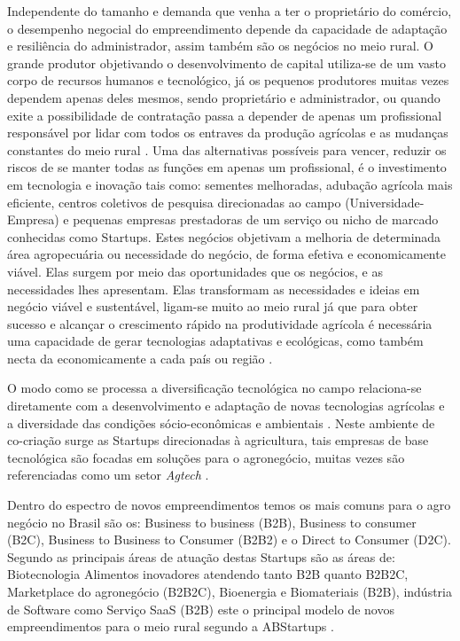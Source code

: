 Independente do tamanho e demanda que venha a ter o proprietário do comércio, o desempenho negocial do empreendimento depende da capacidade de adaptação e resiliência  do administrador, assim também são os negócios no meio rural. O grande produtor objetivando o desenvolvimento de capital utiliza-se de um vasto corpo de recursos humanos e tecnológico, já os pequenos produtores muitas vezes dependem apenas deles mesmos, sendo proprietário e administrador, ou quando exite a possibilidade de contratação passa a depender de apenas um profissional responsável por lidar com todos os entraves da produção agrícolas e as mudanças constantes do meio rural \cite{soares_relacao_2017}. Uma das alternativas possíveis para vencer, reduzir os riscos de se manter todas as funções em apenas um profissional, é o investimento em tecnologia e inovação tais como: sementes melhoradas, adubação agrícola mais eficiente, centros coletivos de pesquisa direcionadas ao campo (Universidade-Empresa) \cite{bochi_dorneles_coletivos_2014, gomes_inovacao_2014} e pequenas empresas prestadoras de um serviço ou nicho de marcado conhecidas como Startups. Estes negócios objetivam a melhoria de determinada área agropecuária \cite{junior_agtechs:_2019} ou necessidade do negócio, de forma efetiva e economicamente viável. Elas surgem por meio das oportunidades que os negócios, e as necessidades lhes apresentam. Elas transformam as necessidades e ideias em negócio viável e sustentável, ligam-se muito ao meio rural já que para obter sucesso e alcançar o crescimento rápido na produtividade agrícola é necessária uma capacidade de gerar tecnologias adaptativas e ecológicas, como também necta da  economicamente a cada país ou região \cite{contini_hayami_2019}.


O modo como se processa a diversificação tecnológica no campo relaciona-se diretamente com a desenvolvimento e adaptação de novas tecnologias agrícolas e a diversidade das condições sócio-econômicas e ambientais \cite{fen-azmeyer_o_2019}. Neste ambiente de co-criação surge as Startups direcionadas à agricultura, tais empresas de base tecnológica são focadas em soluções para o agronegócio, muitas vezes são referenciadas como um setor \textit{Agtech} \cite{blanco_agtechs:_2019}.

Dentro do espectro de novos empreendimentos temos os mais comuns para o agro negócio no Brasil são os: Business to business (B2B), Business to consumer (B2C), Business to Business to Consumer (B2B2) e o Direct to Consumer (D2C). Segundo  as principais áreas de atuação destas Startups são as áreas de: Biotecnologia Alimentos inovadores atendendo tanto B2B quanto B2B2C, Marketplace do agronegócio (B2B2C), Bioenergia e Biomateriais (B2B), indústria de Software como Serviço SaaS (B2B) este o principal modelo de novos empreendimentos para o meio rural segundo a ABStartups \cite{abstartups_startupbase_2019}.



